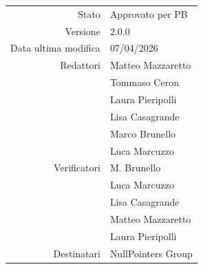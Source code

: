 \begin{center}
\begin{tabular}{r|l}
	Stato & Approvato per PB \\[0.5em]
	Versione & 2.0.0 \\[0.5em]
	Data ultima modifica & 07/04/2026 \\[0.5em]
	Redattori & Matteo Mazzaretto \\
			  & Tommaso Ceron \\
			  & Laura Pieripolli \\
			  & Lisa Casagrande \\
			  & Marco Brunello \\
			  & Luca Marcuzzo \\[0.5em]
	Verificatori & M. Brunello \\
			  & Luca Marcuzzo \\
			  & Lisa Casagrande \\
			  & Matteo Mazzaretto \\
			  & Laura Pieripolli \\[0.5em]
	Destinatari & NullPointers Group \\
\end{tabular}
\end{center}